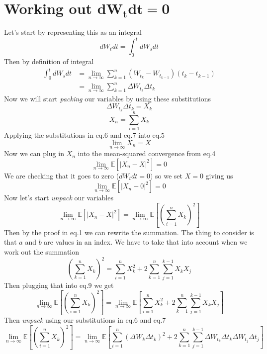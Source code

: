 \documentclass{article}
\begin{document}
\section*{Working out $\boldsymbol{dW_t dt = 0}$}
Let's start by representing this as an integral
$$
dW_t dt = \int_0^t dW_s dt 
$$
Then by definition of integral 
\begin{equation}
\begin{split}
    \int_0^t dW_s dt &= \lim_{n \to \infty} \sum_{k=1}^n \left( W_{t_k} - W_{t_{k-1}} \right) \left(t_k - t_{k-1} \right) \\ 
    & = \lim_{n \to \infty} \sum_{k=1}^n \Delta W_{t_k} \Delta t_k
\end{split}
\end{equation}
Now we will start \emph{packing} our variables by using these substitutions
\begin{equation}
    \Delta W_{t_k} \Delta t_k = X_k 
\end{equation}
\begin{equation}
    X_n = \sum_{i=1}^n X_k
\end{equation}
Applying the substitutions in eq.6 and eq.7 into eq.5 
\begin{equation}
    \lim_{n \to \infty} X_n = X
\end{equation}
Now we can plug in $X_n$ into the mean-squared convergence from eq.4
$$
\lim_{n \to \infty} \mathbb{E}[|X_n - X|^2] = 0
$$
We are checking that it goes to zero ($dW_tdt = 0)$ so we set $X = 0$ giving us
$$
\lim_{n \to \infty} \mathbb{E}[|X_n - 0|^2] = 0
$$
Now let's start \emph{unpack} our variables
\begin{equation}
\lim_{n \to \infty} \mathbb{E} \left[ |X_n - X |^2 \right] = \lim_{n \to \infty} \mathbb{E} \left[ \left( \sum_{i=1}^n X_k \right)^2 \right]
\end{equation}
Then by the proof in eq.1 we can rewrite the summation. The thing to consider is that $a$ and $b$ are values in an index. We have to take that into account when we work out the summation
$$
\left( \sum_{k=1}^n X_k \right)^2 = \sum_{i=1}^n X_k^2 + 2 \sum_{k=1}^n \sum_{j=1}^{k-1}X_k X_j
$$
Then plugging that into eq.9 we get 
$$
\lim_{n \to \infty} \mathbb{E} \left[ \left( \sum_{i=1}^n X_k \right)^2 \right] = \lim_{n \to \infty} \mathbb{E} \left[ \sum_{i=1}^n X_k^2 + 2 \sum_{k=1}^n \sum_{j=1}^{k-1}X_k X_j \right]
$$
Then \emph{unpack} using our substitutions in eq.6 and eq.7
$$
\lim_{n \to \infty} \mathbb{E} \left[ \left( \sum_{i=1}^n X_k \right)^2 \right] = \lim_{n \to \infty} \mathbb{E} \left[ \sum_{i=1}^n (\Delta W_k \Delta t_k)^2 + 2 \sum_{k=1}^n \sum_{j=1}^{k-1} \Delta W_{t_k} \Delta t_k \Delta W_{t_j} \Delta t_j \right]
$$
\end{document}
